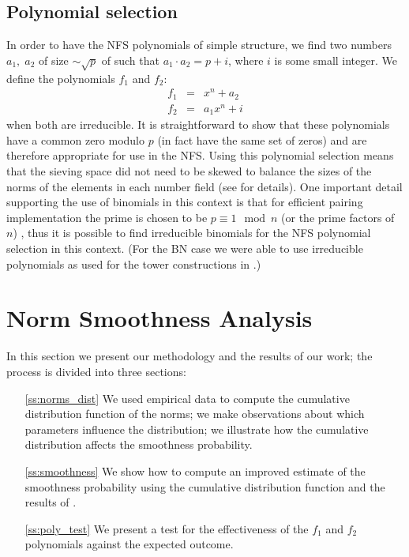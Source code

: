 \documentclass[a4paper, 10pt, envcountsect, runningheads]{article}
\numberwithin{figure}{section}
\numberwithin{equation}{section}
\begin{document}
\subsection{Polynomial selection}
\label{ss:poly_selection}
In order to have the NFS polynomials of simple structure, we find two numbers $a_1,\;a_2$ of size $\sim\sqrt{p}$ of such that $a_1\cdot a_2=p+i$, where $i$ is some small integer. We define the polynomials $f_1$ and $f_2$:
\begin{eqnarray*}
f_1 &=& x^n + a_2\\
f_2 &=& a_1 x^n + i
\end{eqnarray*}
when both are irreducible. It is straightforward to show that these polynomials have a common zero modulo $p$ (in fact have the same set of zeros) and are therefore appropriate for use in the NFS. Using this polynomial selection means that the sieving space did not need to be skewed to balance the sizes of the norms of the elements in each number field (see \cite{joux-lercier-smart-vercauteren06} for details). One important detail supporting the use of binomials in this context is that for efficient pairing implementation the prime is chosen to be $p\equiv1\mod n$ (or the prime factors of $n$) \cite{koblitz-menezes05}, thus it is possible to find irreducible binomials for the NFS polynomial selection in this context. (For the BN case we were able to use irreducible polynomials as used for the tower constructions in \cite{towers}.) %
\section{Norm Smoothness Analysis}
\label{s:results}
In this section we present our methodology and the results of our work; the process is divided into three sections:
\begin{itemize}
\item[\ref{ss:norms_dist}] We used empirical data to compute the cumulative distribution function of the norms; we make observations about which parameters influence the distribution; we illustrate how the cumulative distribution affects the smoothness probability.

\item[\ref{ss:smoothness}] We show how to compute an improved estimate of the smoothness probability using the cumulative distribution function and the results of \cite{dan_psi_est}.

\item[\ref{ss:poly_test}] We present a test for the effectiveness of the $f_1$ and $f_2$ polynomials against the expected outcome.

\end{itemize}
\end{document}
